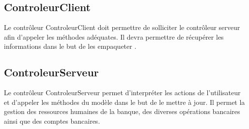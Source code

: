 \subsection{ControleurClient}
Le contrôleur ControleurClient doit permettre de solliciter le contrôleur serveur afin d'appeler les méthodes adéquates.
Il devra permettre de récupérer les informations dans le but de les empaqueter \color{red}{en RMI}
 \color{green}{en JSON afin de récuperer ces informations en REST}.

\subsection{ControleurServeur}
Le contrôleur ControleurServeur permet d'interpréter les actions de l'utilisateur et d'appeler les méthodes du modèle
dans le but de le mettre à jour. Il permet la gestion des ressources humaines de la banque, des diverses opérations
bancaires ainsi que des comptes bancaires.

